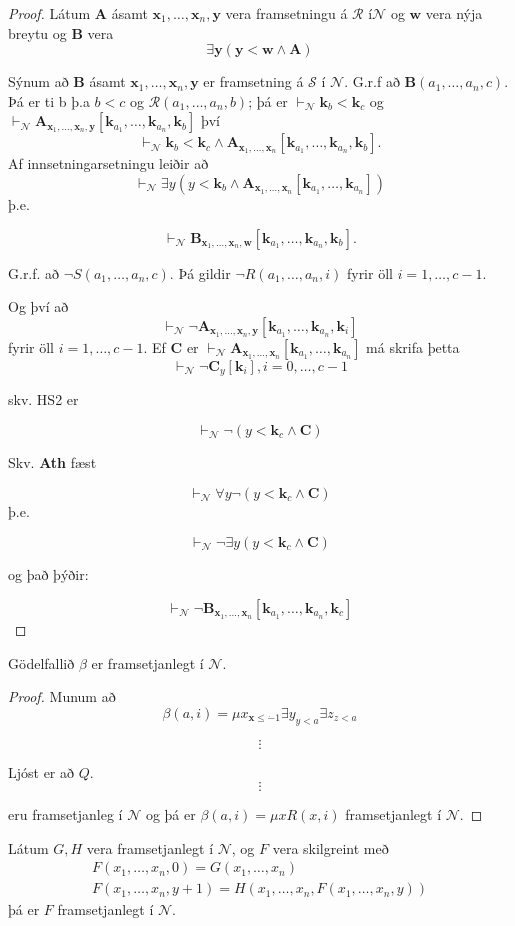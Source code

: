 \documentclass[12pt]{book}
\newcommand{\cS}{\mathcal{S}}
\newcommand{\cN}{\mathcal{N}}
\newcommand{\cR}{\mathcal{R}}
\newcommand{\mb}[1]{\mathbf{#1}}
\newcommand{\bA}{\mathbf{A}}
\newcommand{\bB}{\mathbf{B}}
\newcommand{\bC}{\mathbf{C}}
\newcommand{\bx}{\mathbf{x}}
\newcommand{\bk}{\mathbf{k}}
\newcommand{\by}{\mathbf{y}}
\newcommand{\xxn}{x_1, \dotsc, x_n}
\newcommand{\bxxn}{\bx_1, \dotsc, \bx_n}
\newcommand{\aan}{a_1, \dotsc, a_n}
\newcommand{\bkaan}{\bk_{a_1}, \dotsc,\bk_{a_n}}
\newcommand{\vN}{\vdash_{\cN}}
\begin{document}
\begin{proof}
Látum $\bA$ ásamt $\bxxn, \by$ vera framsetningu á $\cR$ í$\cN$ og $\mb{w}$
vera nýja breytu og $\bB$ vera 
\[ \exists \by (\by < \mb{w} \wedge \bA) \]

Sýnum að $\bB$ ásamt $\bxxn, \by$ er framsetning á $\cS$ í $\cN$.
G.r.f að $\bB(\aan, c)$. Þá er ti b þ.a $b < c$ og $\cR(\aan, b)$;
þá er $\vN \bk_b < \bk_c$ og $\vN \bA_{\bxxn, \by} [\bkaan, \bk_b] $
því
  \[\vdash_{\cN} \bk_b < \bk_c \wedge \bA_{\bxxn} [ \bk_{a_1},
  \dotsc,\bk_{a_n},\bk_b] .\] Af innsetningarsetningu leiðir að
  \[\vdash_{\cN} \exists y ( y < \bk_b \wedge \bA_{\bxxn} [ \bk_{a_1},
  \dotsc,\bk_{a_n}])\] þ.e.
 
  \[\vdash_{\cN} \bB_{\bxxn,\mb{w}} [ \bk_{a_1},
  \dotsc,\bk_{a_n},\bk_b] .\]

  G.r.f. að $\lnot S(\aan,c)$. Þá gildir $\lnot R(\aan, i)$ fyrir öll
  $i = 1, \dotsc, c-1$.

  Og því að
  \[\vdash_{\cN} \lnot \bA_{\bxxn,\by} [ \bk_{a_1},
  \dotsc,\bk_{a_n},\bk_i]\] fyrir öll $i = 1, \dotsc, c-1$.  Ef $\bC$
  er \(\vdash_{\cN}\bA_{\bxxn} [ \bk_{a_1}, \dotsc,\bk_{a_n}]\) má
  skrifa þetta
  \[\vdash_{\cN} \lnot \bC_{y} [ \bk_{i}] , i = 0, \dotsc, c-1 \]

  skv. HS2 er

  \[\vdash_{\cN} \lnot (y < \bk_c \wedge \bC)\]

  Skv. \textbf{Ath} fæst

  \[ \vdash_{\cN} \forall y \lnot (y < \bk_c \wedge \bC) \] þ.e.

  \[ \vdash_{\cN} \lnot \exists y (y < \bk_c \wedge \bC) \]

  og það þýðir:

  \[ \vdash_{\cN} \lnot \bB_{\bxxn} [\bkaan, \bk_c] \]
\end{proof}


\begin{setn}[HS7]
  Gödelfallið $\beta$ er framsetjanlegt í $\cN$.
\end{setn}
\begin{proof}
  Munum að
  \[ \beta(a,i) = \mu x_{\bx \leq \dot{-} 1} \exists y_{y<a} \exists z_{z < a}\]

\[\vdots\]

Ljóst er að $Q$.
\[\vdots\]

eru framsetjanleg í $\cN$ og þá er $\beta(a,i) = \mu x R(x,i)$
framsetjanlegt í $\cN$.
\end{proof}

\begin{setn}[HS8]

Látum $G,H$ vera framsetjanlegt í $\cN$, og $F$ vera skilgreint með
\begin{gather*}
  F(\xxn,0) = G( \xxn)\\
  F(\xxn, y+1) = H(\xxn,F(\xxn,y))
\end{gather*}
þá er $F$ framsetjanlegt í $\cN$.
\end{setn}
\end{document}
